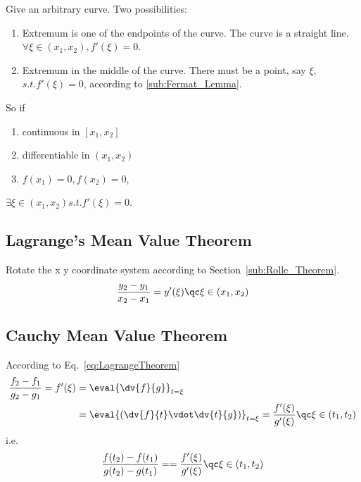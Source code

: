 Give an arbitrary curve. Two possibilities:
\begin{enumerate}
	\item Extremum is one of the endpoints of the curve. The curve is a straight line. \( \forall \xi \in (x_1, x_2), f'(\xi) = 0 \).
	\item Extremum in the middle of the curve. There must be a point, say \( \xi \), \( s.t. f'(\xi) = 0 \), according to \cref{sub:Fermat_Lemma}.
\end{enumerate}

So if 
\begin{enumerate}
	\item continuous in \( [x_1, x_2] \) 
	\item differentiable in \( (x_1, x_2) \) 
	\item \( f(x_1) = 0, f(x_2) = 0 \),
\end{enumerate}
\( \exists \xi \in (x_1, x_2) s.t. f'(\xi) = 0 \).
\subsection{Lagrange's Mean Value Theorem}%
Rotate the x y coordinate system according to Section~\ref{sub:Rolle_Theorem}.
\begin{equation}
	\frac{y_2 - y_1}{x_2 - x_1} = y'(\xi) \qc \xi \in (x_1, x_2) %
	\label{eq:LagrangeTheorem}
\end{equation}


\subsection{Cauchy Mean Value Theorem}%
	According to Eq.~\eqref{eq:LagrangeTheorem} 
\begin{equation*}
\begin{aligned}
	\frac{f_2 - f_1}{g_2 - g_1} = f'(\xi) &= \eval{\dv{f}{g}}_{t = \xi} \\ %
	&= \eval{\left(\dv{f}{t} \vdot
	\dv{t}{g}\right)}_{t = \xi} 
	= \frac{f'(\xi)}{g'(\xi)}
	\qc \xi \in (t_1,t_2)
\end{aligned}
\end{equation*}
i.e.
\begin{equation}
	\frac{f(t_2) - f(t_1)}{g(t_2) - g(t_1)} = 
	= \frac{f'(\xi)}{g'(\xi)}
	\qc \xi \in (t_1,t_2)
\end{equation}

